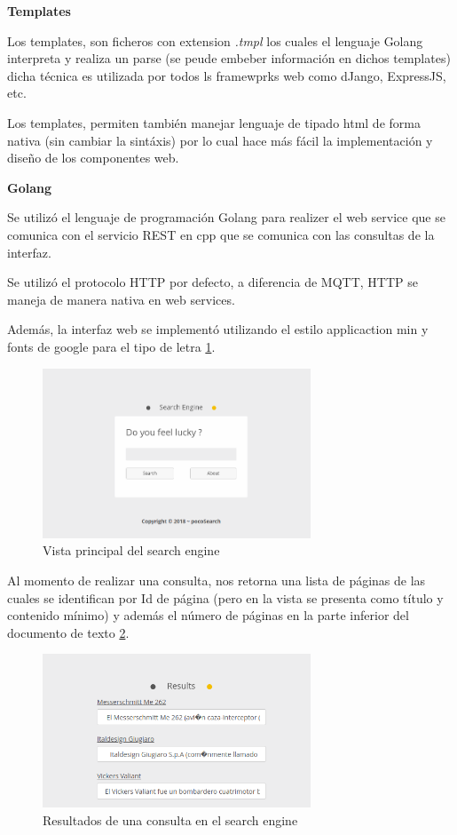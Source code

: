 \documentclass[a4paper]{article}
\begin{document}
\textbf{Templates}

Los templates, son ficheros con extension \textit{.tmpl} los cuales el lenguaje Golang interpreta y realiza un parse (se peude embeber información en dichos templates) dicha técnica es utilizada por todos ls framewprks web como dJango, ExpressJS, etc.

Los templates, permiten también manejar lenguaje de tipado html de forma nativa (sin cambiar la sintáxis) por lo cual hace más fácil la implementación y diseño de los componentes web.

\textbf{Golang}

Se utilizó el lenguaje de programación Golang para realizer el web service que se comunica con el servicio REST en cpp que se comunica con las consultas de la interfaz.

Se utilizó el protocolo HTTP por defecto, a diferencia de MQTT, HTTP se maneja de manera nativa en web services.

Además, la interfaz web se implementó utilizando el estilo applicaction min y fonts de google para el tipo de letra \ref{figsearchengine}.

\begin{figure}[H]
  \centering
  \includegraphics[width=8cm]{images/pocosearch.png}
  \caption{Vista principal del search engine}
  \label{figsearchengine}
\end{figure}

Al momento de realizar una consulta, nos retorna una lista de páginas de las cuales se identifican por Id de página (pero en la vista se presenta como título y contenido mínimo) y además el número de páginas en la parte inferior del documento de texto \ref{figresultsengine}.

\begin{figure}[H]
  \centering
  \includegraphics[width=8cm]{images/results.png}
  \caption{Resultados de una consulta en el search engine}
  \label{figresultsengine}
\end{figure}
\end{document}
